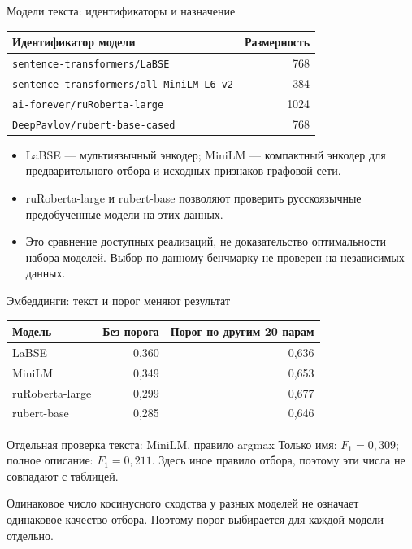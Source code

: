 \documentclass[aspectratio=169,11pt]{beamer}
\begin{document}
\renewcommand{\hseheadertext}{Дополнительные материалы}
\begin{frame}{Модели текста: идентификаторы и назначение}
  \begin{tabular}{@{}lr@{}}
    \toprule
    Идентификатор модели & Размерность \\
    \midrule
    \texttt{sentence-transformers/LaBSE} & 768 \\
    \texttt{sentence-transformers/all-MiniLM-L6-v2} & 384 \\
    \texttt{ai-forever/ruRoberta-large} & 1024 \\
    \texttt{DeepPavlov/rubert-base-cased} & 768 \\
    \bottomrule
  \end{tabular}
  \begin{itemize}
    \item LaBSE --- мультиязычный энкодер; MiniLM --- компактный энкодер для предварительного отбора и исходных признаков графовой сети.
    \item ruRoberta-large и rubert-base позволяют проверить русскоязычные предобученные модели на этих данных.
    \item Это сравнение доступных реализаций, не доказательство оптимальности набора моделей. Выбор по данному бенчмарку не проверен на независимых данных.
  \end{itemize}
\end{frame}

\renewcommand{\hseheadertext}{Дополнительные материалы}
\begin{frame}{Эмбеддинги: текст и порог меняют результат}
  \begin{tabular}{@{}lrr@{}}
    \toprule
    Модель & Без порога & Порог по другим 20 парам \\
    \midrule
    LaBSE & 0{,}360 & 0{,}636 \\
    MiniLM & 0{,}349 & 0{,}653 \\
    ruRoberta-large & 0{,}299 & 0{,}677 \\
    rubert-base & 0{,}285 & 0{,}646 \\
    \bottomrule
  \end{tabular}
  \begin{block}{Отдельная проверка текста: MiniLM, правило argmax}
    Только имя: $F_1=0{,}309$; полное описание: $F_1=0{,}211$.
    Здесь иное правило отбора, поэтому эти числа не совпадают с таблицей.
  \end{block}
  Одинаковое число косинусного сходства у разных моделей не означает одинаковое
  качество отбора. Поэтому порог выбирается для каждой модели отдельно.
\end{frame}
\end{document}

